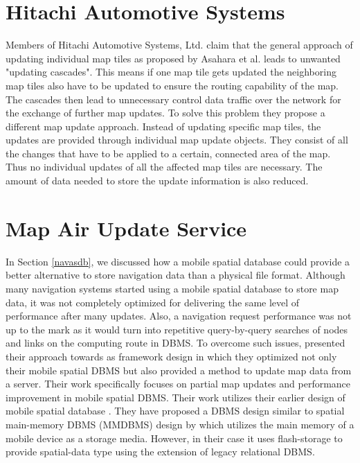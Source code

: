 \section{Hitachi Automotive Systems}
Members of Hitachi Automotive Systems, Ltd. \cite{hitachi} claim that the general approach of updating individual map tiles as proposed by Asahara et al. leads to unwanted "updating cascades". This means if one map tile gets updated the neighboring map tiles also have to be updated to ensure the routing capability of the map. The cascades then lead to unnecessary control data traffic over the network for the exchange of further map updates. To solve this problem they propose a different map update approach. Instead of updating specific map tiles, the updates are provided through individual map update objects. They consist of all the changes that have to be applied to a certain, connected area of the map. Thus no individual updates of all the affected map tiles are necessary. The amount of data needed to store the update information is also reduced.
\section{Map Air Update Service}\label{maus}
In Section \ref{navasdb}, we discussed how a mobile spatial database could provide a better alternative to store navigation data than a physical file format. Although many navigation systems started using a mobile spatial database to store map data, it was not completely optimized for delivering the same level of performance after many updates. Also, a navigation request performance was not up to the mark as it would turn into repetitive query-by-query searches of nodes and links on the computing route in DBMS. To overcome such issues, \citet{min2011system} presented their approach towards as framework design in which they optimized not only their mobile spatial DBMS but also provided a method to update map data from a server. Their work specifically focuses on partial map updates and performance improvement in mobile spatial DBMS. Their work utilizes their earlier design of mobile spatial database \cite{min2008mobile}. They have proposed a DBMS design similar to spatial main-memory DBMS (MMDBMS) design by \citet{yun2005development} which utilizes the main memory of a mobile device as a storage media. However, in their case it uses flash-storage to provide spatial-data type using the extension of legacy relational DBMS. \\

